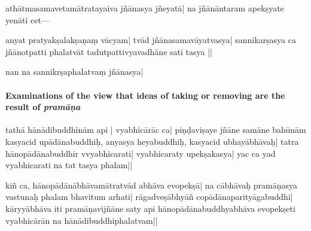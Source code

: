 athātmasamavetamātratayaiva %
jñānasya jñeyatā| na jñānāntaram apekṣyate yenāti %
cet---

 anyat pratyakṣalakṣaṇaṃ vācyam| tvād  jñānasamavāyatvasya| sannikarṣasya ca jñānotpatti%
phalatvāt tadu\-tpattivyavadhāne sati tasya  ||

%
nan 
na sannikrṣaphalatvaṃ jñānasya| %

\paragraph{Examinations of the view that ideas of taking or removing are the result of \emph{pramāṇa}}
tathā hānādibuddhīnām api |
vyabhicārāc ca|  
%
piṇḍaviṣaye jñāne samāne bahūnām  
kasyacid upādānabuddhiḥ, anyasya heyabuddhiḥ, kasyacid ubhayābh\mds āvaḥ\mde | tatra hānopādānabuddhir vvyabhicarati| 
vyabhicaraty upekṣakasya| yac ca yad vyabhicarati na tat tasya phalam|| 

kiñ ca, hānopādānābhāvamātratvād abhāva evopekṣā| na cābhāvaḥ \mds pramā\-ṇa\-sya va\mde stunaḥ \mds %
phalam \mde bhavitum arhati| rāgadveṣābhyāñ copādānaparityāga\-bu\-ddhī| 
kāryyābhāva iti pramāṇavijñāne saty %
api hā\-no\-pādānabuddhyabhāva evopekṣeti 
vyabhicārān na hānādibu\mds ddhiphalatvam||

